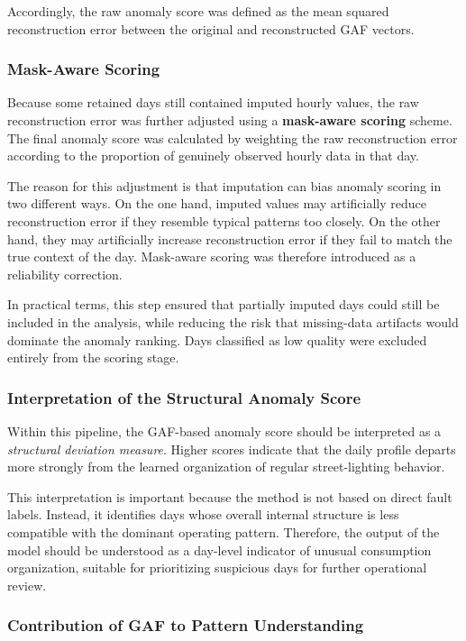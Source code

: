 \documentclass{article}
\begin{document}
Accordingly, the raw anomaly score was defined as the mean squared reconstruction error between the original and reconstructed GAF vectors.

\subsubsection{Mask-Aware Scoring}

Because some retained days still contained imputed hourly values, the raw reconstruction error was further adjusted using a \textbf{mask-aware scoring} scheme. The final anomaly score was calculated by weighting the raw reconstruction error according to the proportion of genuinely observed hourly data in that day.

The reason for this adjustment is that imputation can bias anomaly scoring in two different ways. On the one hand, imputed values may artificially reduce reconstruction error if they resemble typical patterns too closely. On the other hand, they may artificially increase reconstruction error if they fail to match the true context of the day. Mask-aware scoring was therefore introduced as a reliability correction.

In practical terms, this step ensured that partially imputed days could still be included in the analysis, while reducing the risk that missing-data artifacts would dominate the anomaly ranking. Days classified as low quality were excluded entirely from the scoring stage.

\subsubsection{Interpretation of the Structural Anomaly Score}

Within this pipeline, the GAF-based anomaly score should be interpreted as a \emph{structural deviation measure}. Higher scores indicate that the daily profile departs more strongly from the learned organization of regular street-lighting behavior.

This interpretation is important because the method is not based on direct fault labels. Instead, it identifies days whose overall internal structure is less compatible with the dominant operating pattern. Therefore, the output of the model should be understood as a day-level indicator of unusual consumption organization, suitable for prioritizing suspicious days for further operational review.

\subsubsection{Contribution of GAF to Pattern Understanding}
\end{document}
